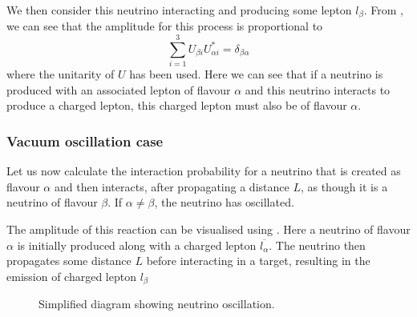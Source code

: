 We then consider this neutrino interacting and producing some lepton $l_{\beta}$.
From , we can see that the amplitude for this process is proportional to
\begin{equation}
  \sum_{i=1}^{3} U_{\beta i}U_{\alpha i}^{*} = \delta_{\beta \alpha}
\end{equation}
where the unitarity of $U$ has been used.
Here we can see that if a neutrino is produced with an associated lepton of flavour $\alpha$ and this neutrino interacts to produce a charged lepton, this charged lepton must also be of flavour $\alpha$.

\subsubsection{Vacuum oscillation case}

Let us now calculate the interaction probability for a neutrino that is created as flavour $\alpha$ and then interacts, after propagating a distance $L$, as though it is a neutrino of flavour $\beta$.
If $\alpha \neq \beta$, the neutrino has oscillated.

The amplitude of this reaction can be visualised using .
Here a neutrino of flavour $\alpha$ is initially produced along with a charged lepton $\overline{l_{\alpha}}$.
The neutrino then propagates some distance $L$ before interacting in a target, resulting in the emission of charged lepton $l_{\beta}$

\begin{figure}[h]
  \centering
  \caption[Simplified diagram showing neutrino oscillation]{Simplified diagram showing neutrino oscillation.}
  \label{fig:oscillationDiag1}
\end{figure}

